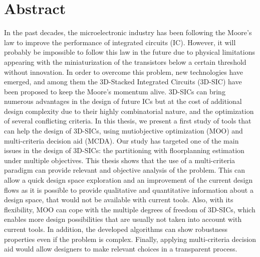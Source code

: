 \chapter{Abstract}

In the past decades, the microelectronic industry has been following the Moore's law to improve the performance of integrated circuits (IC). However, it will probably be impossible to follow this law in the future due to physical limitations appearing with the miniaturization of the transistors below a certain threshold without innovation. In order to overcome this problem, new technologies have emerged, and among them the 3D-Stacked Integrated Circuits (3D-SIC) have been proposed to keep the Moore's momentum alive. 3D-SICs can bring numerous advantages in the design of future ICs but at the cost of additional design complexity due to their highly combinatorial nature, and the optimization of several conflicting criteria. In this thesis, we present a first study of tools that can help the design of 3D-SICs, using mutiobjective optimization (MOO) and multi-criteria decision aid (MCDA). Our study has targeted one of the main issues in the design of 3D-SICs: the partitioning with floorplanning estimation under multiple objectives. This thesis shows that the use of a multi-criteria paradigm can provide relevant and objective analysis of the problem. This can allow a quick design space exploration and an improvement of the current design flows as it is possible to provide qualitative and quantitative information about a design space, that would not be available with current tools. Also, with its flexibility, MOO can cope with the multiple degrees of freedom of 3D-SICs, which enables more design possibilities that are usually not taken into account with current tools. In addition, the developed algorithms can show robustness properties even if the problem is complex. Finally, applying multi-criteria decision aid would allow designers to make relevant choices in a transparent process.